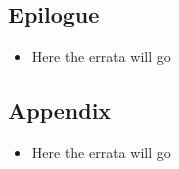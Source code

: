 \documentclass{article}
\begin{document}
\subsection*{Epilogue}
\begin{itemize}
\item Here the errata will go
\end{itemize}

\subsection*{Appendix}
\begin{itemize}
\item Here the errata will go
\end{itemize}
\end{document}
